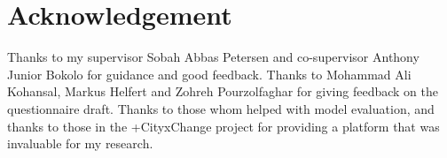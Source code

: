 \chapter*{Acknowledgement}
Thanks to my supervisor Sobah Abbas Petersen and co-supervisor Anthony Junior Bokolo for guidance and good feedback. Thanks to Mohammad Ali Kohansal, Markus Helfert and Zohreh Pourzolfaghar for giving feedback on the questionnaire draft. Thanks to those whom helped with model evaluation, and thanks to those in the +CityxChange project for providing a platform that was invaluable for my research. 